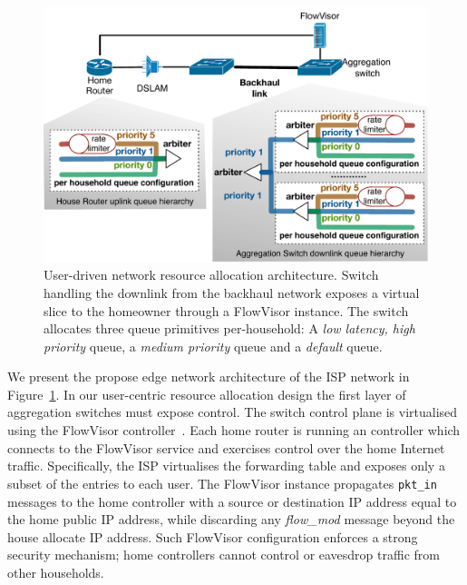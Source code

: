 \begin{figure}
  \centering
  \includegraphics[width=0.7\columnwidth]{queue_design}
  \caption{User-driven network resource allocation architecture. 
    \label{fig:queue_design} Switch handling the downlink from the backhaul
    network exposes a
    virtual slice to the homeowner through a FlowVisor instance.  The switch
    allocates three queue primitives per-household: A {\it low latency,
      high priority} \/queue, a {\it medium priority} \/queue and a {\it default}
    \/queue.}
\end{figure}

We present the propose edge network architecture of the ISP network in
Figure~\ref{fig:queue_design}.  In our user-centric resource allocation design
the first layer of aggregation switches must expose \of control.  The switch
control plane is virtualised using the FlowVisor
controller~\cite{flowvisor-osdi}. Each home router is running an \of controller
which connects to the FlowVisor service and exercises control over the home
Internet traffic. Specifically, the ISP virtualises the \of forwarding table and
exposes only a subset of the entries to each user.  The FlowVisor instance
propagates {\tt pkt\_in} messages to the home controller with a source or
destination IP address equal to the home public IP address, while 
discarding any {\it flow\_mod} message beyond the house allocate IP address.
Such FlowVisor configuration enforces a strong security mechanism; home
controllers cannot control or eavesdrop traffic from other households. 

